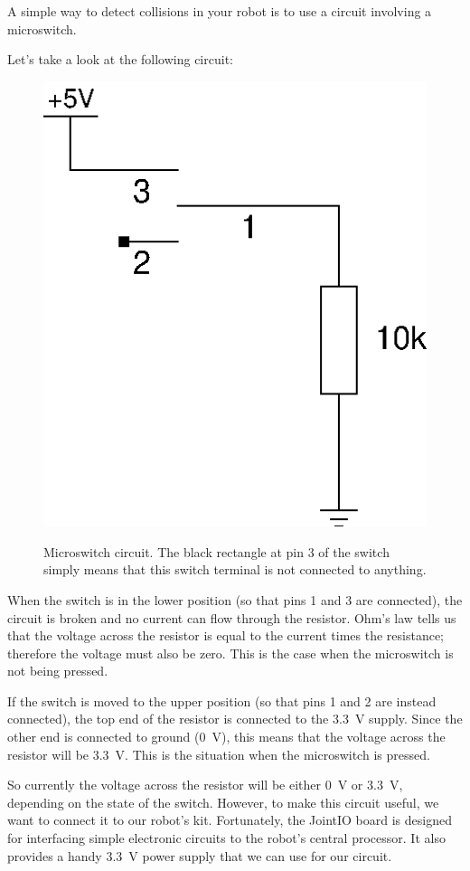 \documentclass{article}
\begin{document}
A simple way to detect collisions in your robot is to use a circuit involving a
microswitch. 

Let's take a look at the following circuit:

\begin{figure}[h]
\centering
\includegraphics[scale=.7]{assets/fig/schem/switch}
\label{fig:schem:switch}
\caption{Microswitch circuit. The black rectangle at pin 3 of the switch simply
means that this switch terminal is not connected to anything.}
\end{figure}

When the switch is in the lower position (so that pins 1 and 3 are connected),
the circuit is broken and no current can flow through the resistor. Ohm's law
tells us that the voltage across the resistor is equal to the current times the
resistance; therefore the voltage must also be zero. This is the case when the
microswitch is not being pressed.

If the switch is moved to the upper position (so that pins 1 and 2 are instead
connected), the top end of the resistor is connected to the \SI{3.3}{\volt}
supply. Since the other end is connected to ground (\SI{0}{\volt}), this means
that the voltage across the resistor will be \SI{3.3}{\volt}. This is the
situation when the microswitch is pressed.

So currently the voltage across the resistor will be either \SI{0}{\volt} or
\SI{3.3}{\volt}, depending on the state of the switch. However, to make this
circuit useful, we want to connect it to our robot's kit. Fortunately, the
JointIO board is designed for interfacing simple electronic circuits to the
robot's central processor. It also provides a handy \SI{3.3}{\volt} power supply
that we can use for our circuit.
\end{document}
